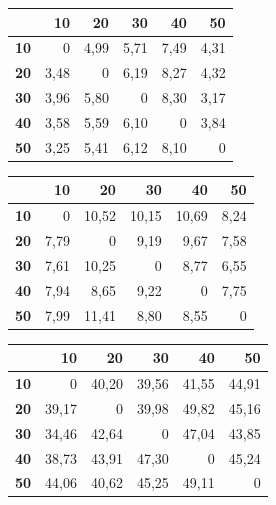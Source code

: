 \expandafter\def\csname matriz@W_3\endcsname{\begin{tabular}[t]{@{}r|rrrrr@{}}
\toprule
 & \textbf{10} & \textbf{20} & \textbf{30} & \textbf{40} & \textbf{50}\\ \midrule
\textbf{10} & 0 & 4,99 & 5,71 & 7,49 & 4,31\\
\textbf{20} & 3,48 & 0 & 6,19 & 8,27 & 4,32\\
\textbf{30} & 3,96 & 5,80 & 0 & 8,30 & 3,17\\
\textbf{40} & 3,58 & 5,59 & 6,10 & 0 & 3,84\\
\textbf{50} & 3,25 & 5,41 & 6,12 & 8,10 & 0\\
\bottomrule
\end{tabular}}
\expandafter\def\csname matriz@W_4\endcsname{\begin{tabular}[t]{@{}r|rrrrr@{}}
\toprule
 & \textbf{10} & \textbf{20} & \textbf{30} & \textbf{40} & \textbf{50}\\ \midrule
\textbf{10} & 0 & 10,52 & 10,15 & 10,69 & 8,24\\
\textbf{20} & 7,79 & 0 & 9,19 & 9,67 & 7,58\\
\textbf{30} & 7,61 & 10,25 & 0 & 8,77 & 6,55\\
\textbf{40} & 7,94 & 8,65 & 9,22 & 0 & 7,75\\
\textbf{50} & 7,99 & 11,41 & 8,80 & 8,55 & 0\\
\bottomrule
\end{tabular}}
\expandafter\def\csname matriz@W_5\endcsname{\begin{tabular}[t]{@{}r|rrrrr@{}}
\toprule
 & \textbf{10} & \textbf{20} & \textbf{30} & \textbf{40} & \textbf{50}\\ \midrule
\textbf{10} & 0 & 40,20 & 39,56 & 41,55 & 44,91\\
\textbf{20} & 39,17 & 0 & 39,98 & 49,82 & 45,16\\
\textbf{30} & 34,46 & 42,64 & 0 & 47,04 & 43,85\\
\textbf{40} & 38,73 & 43,91 & 47,30 & 0 & 45,24\\
\textbf{50} & 44,06 & 40,62 & 45,25 & 49,11 & 0\\
\bottomrule
\end{tabular}}
\newcommand{\tabelaTempos}{\W{1} & \dado{W_1.bf.rounds} & 0,000102 $\pm$ 0,000051\textsuperscript{$\dagger$} & 0,603 $\pm$ 0,079\textsuperscript{$\dagger$} & 0,000267 $\pm$ 0,000173\textsuperscript{$\dagger$}\\
\W{2} & \dado{W_2.bf.rounds} & 0,0123 $\pm$ 0,0011 & 499 $\pm$ 44 & 38,1 $\pm$ 1,8\\
\W{3} & \dado{W_3.bf.rounds} & 0,103 $\pm$ 0,004 & \textit{$\approx$ 31.900} & \textit{$\approx$ 10.400}\\
\W{4} & \dado{W_4.bf.rounds} & 1,47 $\pm$ 0,05 & \textit{$\approx$ $3{,}19\cdot10^{7}$} & \textit{$\approx$ $1{,}24\cdot10^{6}$}\\
\W{5} & \dado{W_5.bf.rounds} & 6,11 $\pm$ 0,06 & \textit{$\approx$ $3{,}19\cdot10^{10}$} & \textit{$\approx$ $6{,}45\cdot10^{7}$}\\}
